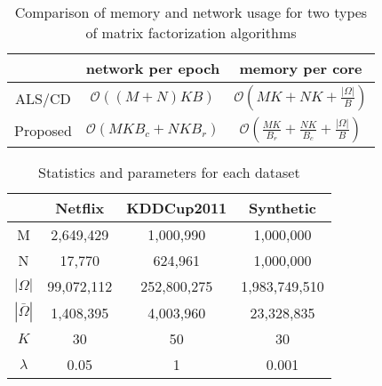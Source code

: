 \documentclass{article}
\newcommand{\1}[0]{\ensuremath{\boldsymbol{1}}\xspace}
\begin{document}
\begin{table}\label{mf_alg_comp}
\footnotesize
\caption{Comparison of memory and network usage for two types of matrix factorization algorithms}
\begin{tabular}{c|c|c}
~  &  network per epoch & memory per core\\
\hline
ALS/CD & $\mathcal{O}( (M+N) K B)$  & $\mathcal{O}(MK+NK + \frac{|\Omega|}{B})$  \\
Proposed & $\mathcal{O}( MK B_{c} + NK B_{r})$ & $\mathcal{O}(\frac{MK}{B_{r}}+\frac{NK}{B_{c}} + \frac{|\Omega|}{B})$ \\
\end{tabular}
\end{table}


\begin{table}\label{mf_datasets}
\caption{ Statistics and parameters for each dataset}
\begin{tabular}{c|ccc}
~ & Netflix &  KDDCup2011 & Synthetic\\
\hline
M & 2,649,429 & 1,000,990 & 1,000,000\\
N & 17,770 & 624,961 & 1,000,000 \\
$|\Omega|$ & 99,072,112 & 252,800,275 & 1,983,749,510 \\
$|\bar\Omega|$ & 1,408,395 & 4,003,960 & 23,328,835  \\
$K$ & 30 & 50 & 30\\
$\lambda$ & 0.05 & 1 & 0.001
\end{tabular}
\end{table}




\newpage


\end{document}
